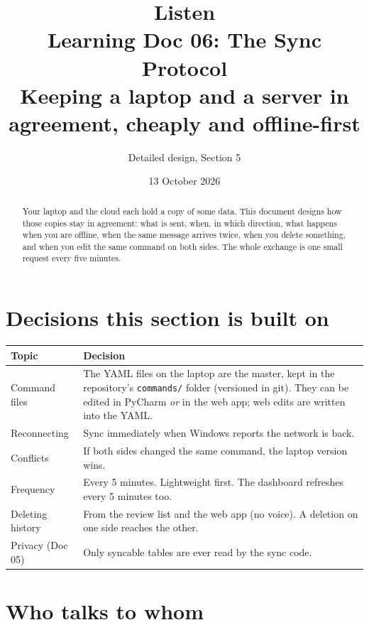\documentclass[11pt,a4paper]{article}
\title{\textbf{Listen}\\[4pt]\large Learning Doc 06: The Sync Protocol\\
       \normalsize Keeping a laptop and a server in agreement, cheaply and offline-first}
\author{Detailed design, Section 5}
\date{13 October 2026}
\begin{document}
\maketitle

\begin{abstract}
\noindent Your laptop and the cloud each hold a copy of some data. This document designs how
those copies stay in agreement: what is sent, when, in which direction, what happens when
you are offline, when the same message arrives twice, when you delete something, and when you
edit the same command on both sides. The whole exchange is one small request every five
minutes.
\end{abstract}

\tableofcontents
\newpage

\section{Decisions this section is built on}
\begin{center}
\renewcommand{\arraystretch}{1.2}
\begin{tabularx}{\textwidth}{l X}
\toprule
\textbf{Topic} & \textbf{Decision} \\
\midrule
Command files     & The YAML files on the laptop are the master, kept in the repository's \texttt{commands/} folder (versioned in git). They can be edited in PyCharm \emph{or} in the web app; web edits are written into the YAML. \\
Reconnecting      & Sync immediately when Windows reports the network is back. \\
Conflicts         & If both sides changed the same command, the laptop version wins. \\
Frequency         & Every 5 minutes. Lightweight first. The dashboard refreshes every 5 minutes too. \\
Deleting history  & From the review list and the web app (no voice). A deletion on one side reaches the other. \\
Privacy (Doc 05)  & Only syncable tables are ever read by the sync code. \\
\bottomrule
\end{tabularx}
\end{center}

\section{Who talks to whom}
\end{document}
